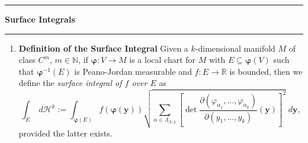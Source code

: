 \documentclass[11pt]{article}
\newcommand{\bvarphi}{\boldsymbol{\varphi}}
\newcommand{\by}{\mathbf{y}}
\newcommand{\pjm}{Peano-Jordan measurable }
\begin{document}
\hrule
{\Large \bf Surface Integrals}
\vspace{1mm}
\hrule
\begin{enumerate}
\item \textbf{Definition of the Surface Integral}
Given a $k$-dimensional manifold $M$ of class $C^m$, $m \in \mathbb{N}$, if
$\bvarphi: V \rightarrow M$ is a local chart for $M$ with
$E \subseteq \bvarphi(V)$ such that $\bvarphi^{-1}(E)$ is \pjm and
$f: E \rightarrow \mathbb{R}$ is bounded, then we define the \emph{surface
integral of $f$ over $E$} as
\[\int_E \; d\mathcal{H}^k
 := \int_{\bvarphi(E)} f(\bvarphi(\by))
    \sqrt{
        \sum_{\alpha \in \Lambda_{N,k}}
            \left[
                \det\frac
                    {\partial(\varphi_{\alpha_1},\ldots,\varphi_{\alpha_k})}
                    {\partial(y_1,\ldots,y_k)}(\by)
            \right]^2
    } \; d\by,\]
provided the latter exists.
\end{enumerate}
\end{document}
